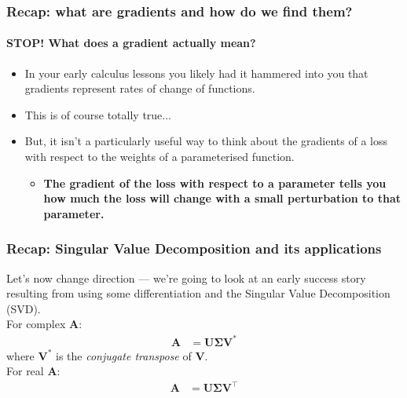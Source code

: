 \documentclass[\beamerclass]{beamer}
\begin{document}
\begin{frame}
\frametitle{Recap: what are gradients and how do we find them?}
\framesubtitle{STOP! What does a gradient actually mean?}

\begin{itemize}
	\item<+-> In your early calculus lessons you likely had it hammered into you that gradients represent rates of change of functions.
	\item<+-> This is of course totally true...
	\item<+-> But, it isn't a particularly useful way to think about the gradients of a loss with respect to the weights of a parameterised function.
	\begin{itemize}
		\item<+-> \textbf{The gradient of the loss with respect to a parameter tells you how much the loss will change with a small perturbation to that parameter.}
	\end{itemize}
\end{itemize}

\end{frame}

\begin{frame}
\frametitle{Recap: Singular Value Decomposition and its applications}
Let's now change direction --- we're going to look at an early success story resulting from using some differentiation and the Singular Value Decomposition (SVD).
\\[1em]
For complex $\bm A:$ \\
\begin{align*}
\bm A &= \bm U \bm \Sigma \bm V^*
\end{align*}
where $\bm V^*$ is the \emph{conjugate transpose} of $\bm V$.\\[1em]
For real $\bm A:$ \\
\begin{align*}
\bm A &= \bm U \bm \Sigma \bm V^\top
\end{align*}
\end{frame}
\end{document}
